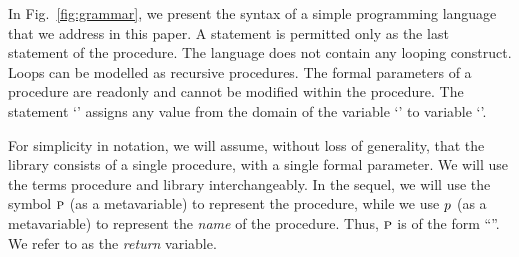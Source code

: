 In Fig.~\ref{fig:grammar}, we present the syntax of a simple
programming language that we address in this paper.
A  statement is permitted only as the last statement of
the procedure.
The language does not contain any looping construct.
Loops can be modelled as recursive procedures.
The formal parameters of a procedure are readonly and cannot be
modified within the procedure.
The
statement `' assigns any value from the domain of the variable
`' to variable `'.

For simplicity in notation, we will assume, without loss of generality,
that the library consists of a single procedure, with a single formal
parameter. We will use the terms procedure and library interchangeably.
In the sequel, we will use the symbol $\textsc{p}$ (as a metavariable) to represent the procedure,
while we use $p$ (as a metavariable) to represent the \emph{name} of the procedure.
Thus, $\textsc{p}$ is of the form ``''. We refer to  as the \emph{return}
variable.
